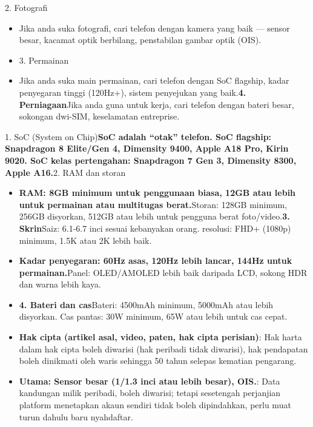 \begin{tcbinfo}{2. Fotografi}
\begin{itemize}
  \item Jika anda suka fotografi, cari telefon dengan kamera yang baik — sensor besar, kacamat optik berbilang, penstabilan gambar optik (OIS).
  \item 3. Permainan
  \item Jika anda suka main permainan, cari telefon dengan SoC flagship, kadar penyegaran tinggi (120Hz+), sistem penyejukan yang baik.\textbf{4. Perniagaan}Jika anda guna untuk kerja, cari telefon dengan bateri besar, sokongan dwi-SIM, keselamatan entreprise.
\end{itemize}

\end{tcbinfo}


1. SoC (System on Chip)\textbf{SoC adalah “otak” telefon. SoC flagship: Snapdragon 8 Elite/Gen 4, Dimensity 9400, Apple A18 Pro, Kirin 9020. SoC kelas pertengahan: Snapdragon 7 Gen 3, Dimensity 8300, Apple A16.}2. RAM dan storan

\begin{itemize}
  \item \textbf{RAM: 8GB minimum untuk penggunaan biasa, 12GB atau lebih untuk permainan atau multitugas berat.}Storan: 128GB minimum, 256GB disyorkan, 512GB atau lebih untuk pengguna berat foto/video.\textbf{3. Skrin}Saiz: 6.1-6.7 inci sesuai kebanyakan orang. resolusi: FHD+ (1080p) minimum, 1.5K atau 2K lebih baik.
  \item \textbf{Kadar penyegaran: 60Hz asas, 120Hz lebih lancar, 144Hz untuk permainan.}Panel: OLED/AMOLED lebih baik daripada LCD, sokong HDR dan warna lebih kaya.
  \item \textbf{4. Bateri dan cas}Bateri: 4500mAh minimum, 5000mAh atau lebih disyorkan. Cas pantas: 30W minimum, 65W atau lebih untuk cas cepat.
  \item \textbf{Hak cipta (artikel asal, video, paten, hak cipta perisian)}: Hak harta dalam hak cipta boleh diwarisi (hak peribadi tidak diwarisi), hak pendapatan boleh dinikmati oleh waris sehingga 50 tahun selepas kematian pengarang.
  \item \textbf{Utama: Sensor besar (1/1.3 inci atau lebih besar), OIS.}: Data kandungan milik peribadi, boleh diwarisi; tetapi sesetengah perjanjian platform menetapkan akaun sendiri tidak boleh dipindahkan, perlu muat turun dahulu baru nyahdaftar.
\end{itemize}

